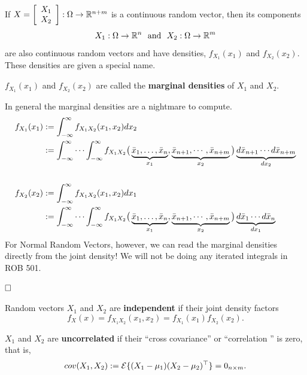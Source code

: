  If $X = \left[ \begin{array}{cc} X_1 \\
                                               X_2 \end{array} \right] :\Omega \to \mathbb R^{n+m}$ is a continuous random vector, then its components
                                               $$X_1:\Omega \to \mathbb R^n~~\text{and}~~X_2: \Omega \to \mathbb R^m$$ are also continuous random vectors and have densities, $f_{X_1}(x_1)$ and $f_{X_2}(x_2)$. These densities are given a special name. 

\begin{definition} $f_{X_1}(x_1)$ and $f_{X_2}(x_2)$  are called the \textbf{marginal densities} of $X_1$ and $X_2$.
       
\end{definition}

\begin{fact} In general the marginal densities are a nightmare to compute.  \begin{align*} f_{X_1}(x_1) &:= \int_{-\infty}^{\infty} f_{X_1 X_2}(x_1, x_2) d x_2  \medskip \\
 &: =\int_{-\infty}^{\infty} \cdots \int_{-\infty}^{\infty} f_{X_1X_2}\big( \underbrace{ \bar{x}_1, \ldots, \bar{x}_n }_{x_1}, \underbrace{ \bar{x}_{n+1} , \cdots, \bar{x}_{n+m}}_{x_2} \big) \underbrace{d\bar{x}_{n+1} \cdots d\bar{x}_{n+m}}_{dx_2}\\
 \\
 f_{X_2}(x_2) &:= \int_{-\infty}^{\infty} f_{X_1 X_2}(x_1, x_2) d x_1  \medskip \\
 &: =\int_{-\infty}^{\infty} \cdots \int_{-\infty}^{\infty} f_{X_1X_2}\big( \underbrace{ \bar{x}_1, \ldots, \bar{x}_n }_{x_1}, \underbrace{ \bar{x}_{n+1} , \cdots, \bar{x}_{n+m}}_{x_2} \big) \underbrace{d\bar{x}_{1} \cdots d\bar{x}_{n}}_{dx_1}\\
\end{align*}
For Normal Random Vectors, however, we can read the marginal densities directly from the joint density! We will not be doing any iterated integrals in ROB 501.
 
$\hfill \square$  \end{fact} 

\begin{definition} Random vectors $X_1$ and $X_2$ are \textbf{independent} if their joint density factors
        $$f_X(x)=f_{X_1 X_2}(x_1,x_2)=f_{X_1}(x_1)f_{X_2}(x_2).$$

$X_1$ and $X_2$ are \textbf{uncorrelated} if their ``cross covariance'' or ``correlation '' is zero, that is, 
        $$cov(X_1,X_2) := \mathcal{E} \{ (X_1-\mu_1)(X_2-\mu_2)^\top \} = 0_{n \times m}.$$
       
\end{definition}


